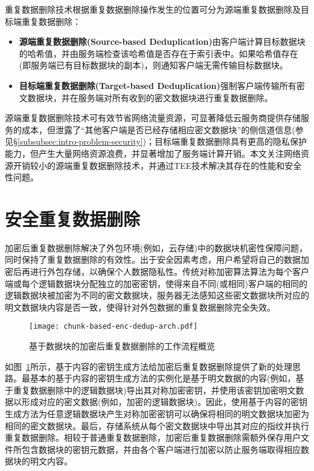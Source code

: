 重复数据删除技术根据重复数据删除操作发生的位置可分为源端重复数据删除及目标端重复数据删除\cite{IDC2010Data}：

\begin{itemize}[leftmargin=*]
    \item \textbf{源端重复数据删除(Source-based Deduplication)}由客户端计算目标数据块的哈希值，并由服务端检查该哈希值是否存在于索引表中。如果哈希值存在(即服务端已有目标数据块的副本)，则通知客户端无需传输目标数据块。
    \item \textbf{目标端重复数据删除(Target-based Deduplication)}强制客户端传输所有密文数据块，并在服务端对所有收到的密文数据块进行重复数据删除。
\end{itemize}

源端重复数据删除技术可有效节省网络流量资源，可显著降低云服务商提供存储服务的成本，但泄露了“其他客户端是否已经存储相应密文数据块”的侧信道信息(参见\S\ref{subsubsec:intro-problem-security})；目标端重复数据删除具有更高的隐私保护能力，但产生大量网络资源浪费，并显著增加了服务端计算开销。本文关注网络资源开销较小的源端重复数据删除技术，并通过TEE技术解决其存在的性能和安全性问题。

\section{安全重复数据删除}
\label{sec:background-enc-deduplication}

加密后重复数据删除解决了外包环境(例如，云存储)中的数据块机密性保障问题，同时保持了重复数据删除的有效性。出于安全因素考虑，用户希望将自己的数据加密后再进行外包存储，以确保个人数据隐私性。传统对称加密算法算法为每个客户端或每个逻辑数据块分配独立的加密密钥，使得来自不同(或相同)客户端的相同的逻辑数据块被加密为不同的密文数据块，服务器无法感知这些密文数据块所对应的明文数据块内容是否一致，使得针对外包数据的重复数据删除完全失效。

\begin{figure}[!htb]
    \small
    \centering
    \texttt{[image: chunk-based-enc-dedup-arch.pdf]}
    \caption{基于数据块的加密后重复数据删除的工作流程概览}
    \label{fig:chunk-based-enc-dedup-flow}
\end{figure}

如图~\ref{fig:chunk-based-enc-dedup-flow}所示，基于内容的密钥生成方法给加密后重复数据删除提供了新的处理思路。最基本的基于内容的密钥生成方法的实例化是基于明文数据的内容(例如，基于重复数据删除中的逻辑数据块)导出其对称加密密钥，并使用该密钥加密明文数据以形成对应的密文数据(例如，加密的逻辑数据块)。因此，使用基于内容的密钥生成方法为任意逻辑数据块产生对称加密密钥可以确保将相同的明文数据块加密为相同的密文数据块。最后，存储系统从每个密文数据块中导出其对应的指纹并执行重复数据删除。相较于普通重复数据删除，加密后重复数据删除需额外保存用户文件所包含数据块的密钥元数据，并由各个客户端进行加密以防止服务端取得相应数据块的明文内容。

